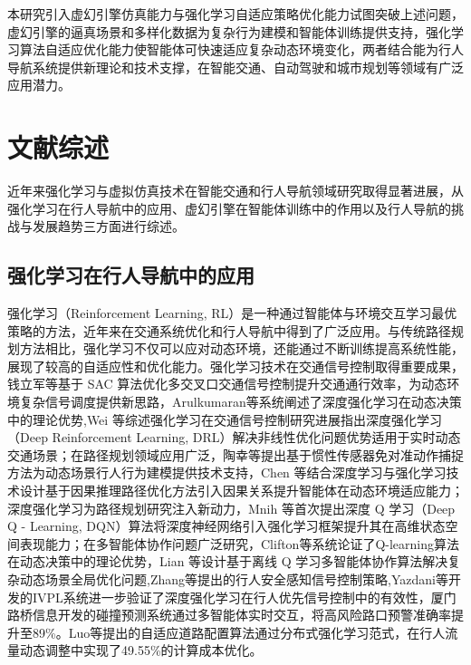本研究引入虚幻引擎仿真能力与强化学习自适应策略优化能力试图突破上述问题，虚幻引擎的逼真场景和多样化数据为复杂行为建模和智能体训练提供支持，强化学习算法自适应优化能力使智能体可快速适应复杂动态环境变化，两者结合能为行人导航系统提供新理论和技术支撑，在智能交通、自动驾驶和城市规划等领域有广泛应用潜力。

\section{文献综述}

近年来强化学习与虚拟仿真技术在智能交通和行人导航领域研究取得显著进展，从强化学习在行人导航中的应用、虚幻引擎在智能体训练中的作用以及行人导航的挑战与发展趋势三方面进行综述。

\subsection{强化学习在行人导航中的应用}

强化学习（Reinforcement Learning, RL）是一种通过智能体与环境交互学习最优策略的方法，近年来在交通系统优化和行人导航中得到了广泛应用。与传统路径规划方法相比，强化学习不仅可以应对动态环境，还能通过不断训练提高系统性能，展现了较高的自适应性和优化能力。强化学习技术在交通信号控制取得重要成果，钱立军等\cite{qian2024sac}基于 SAC 算法优化多交叉口交通信号控制提升交通通行效率，为动态环境复杂信号调度提供新思路，Arulkumaran等\cite{arulkumaran2017deeprl}系统阐述了深度强化学习在动态决策中的理论优势,Wei 等\cite{wei2021survey}综述强化学习在交通信号控制研究进展指出深度强化学习（Deep Reinforcement Learning, DRL）解决非线性优化问题优势适用于实时动态交通场景；在路径规划领域应用广泛，陶幸等\cite{tao2024motion}提出基于惯性传感器免对准动作捕捉方法为动态场景行人行为建模提供技术支持，Chen 等\cite{chen2018ionet}结合深度学习与强化学习技术设计基于因果推理路径优化方法引入因果关系提升智能体在动态环境适应能力；深度强化学习为路径规划研究注入新动力，Mnih 等\cite{mnih2013dqn}首次提出深度 Q 学习（Deep Q - Learning, DQN）算法将深度神经网络引入强化学习框架提升其在高维状态空间表现能力；在多智能体协作问题广泛研究，Clifton等\cite{clifton2020qlearning}系统论证了Q-learning算法在动态决策中的理论优势，Lian 等\cite{lian2023inverseql}设计基于离线 Q 学习多智能体协作算法解决复杂动态场景全局优化问题,Zhang等\cite{zhang2019pedestrian}提出的行人安全感知信号控制策略,Yazdani等\cite{yazdani2023ivpl}开发的IVPL系统进一步验证了深度强化学习在行人优先信号控制中的有效性，厦门路桥信息\cite{xiamen2025}开发的碰撞预测系统通过多智能体实时交互，将高风险路口预警准确率提升至89\%。Luo等\cite{luo2023adaptive}提出的自适应道路配置算法通过分布式强化学习范式，在行人流量动态调整中实现了49.55\%的计算成本优化。

